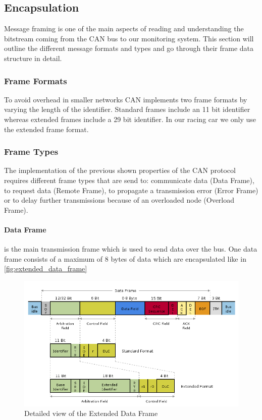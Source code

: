 \subsection{Encapsulation}
Message framing is one of the main aspects of reading and understanding the
bitstream coming from the CAN bus to our monitoring system. This section will
outline the different message formats and types and go through their frame data
structure in detail.
	\subsubsection{Frame Formats}
	To avoid overhead in smaller networks CAN implements two frame formats by
	varying the length of the identifier. Standard frames include an 11 bit
	identifier whereas extended frames include a 29 bit identifier. In our racing
	car we only use the extended frame format.
	\subsubsection{Frame Types}
	The implementation of the previous shown properties of the CAN protocol
	requires different frame types that are send to: communicate data (Data Frame),
	to request data (Remote Frame), to propagate a transmission error (Error Frame) or
	to delay further transmissions because of an overloaded node (Overload Frame).
	
	\paragraph{Data Frame} is the main transmission frame which is used to
	send data over the bus. One data frame consists of a maximum of 8 bytes of data which are
	encapsulated like in \autoref{fig:extended_data_frame}
	
	\begin{figure}[htb] \centering
		\includegraphics[width=1\textwidth]{content/pictures/data_frame.png}
		\caption{Detailed view of the Extended Data Frame \cite{vector:2012:online}}
		\label{fig:extended_data_frame}
	\end{figure}
	
